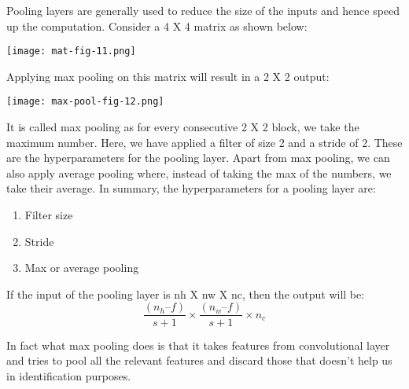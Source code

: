 Pooling layers are generally used to reduce the size of the inputs and hence speed up the computation. Consider a 4 X 4 matrix as shown below:

\texttt{[image: mat-fig-11.png]}

Applying max pooling on this matrix will result in a 2 X 2 output:

\texttt{[image: max-pool-fig-12.png]}

It is called max pooling as for every consecutive 2 X 2 block, we take the maximum number. Here, we have applied a filter of size 2 and a stride of 2. These are the hyperparameters for the pooling layer. Apart from max pooling, we can also apply average pooling where, instead of taking the max of the numbers, we take their average. In summary, the hyperparameters for a pooling layer are:

\begin{enumerate}
  \item Filter size
  \item Stride
  \item Max or average pooling
\end{enumerate}


If the input of the pooling layer is nh X nw X nc, then the output will be:
$$ \frac{(n_h – f)}{s + 1} \times \frac{(n_w – f)}{s + 1} \times n_c $$

In fact what max pooling does is that it takes features from convolutional layer and tries to pool all the relevant features and discard those that doesn’t help us in identification purposes.
